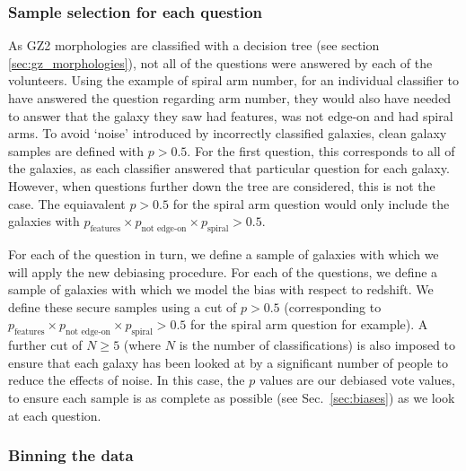 \documentclass[useAMS,usenatbib]{mn2e}
\begin{document}
\subsubsection{Sample selection for each question}
\label{sec:sample_selection_per_question}

As GZ2 morphologies are classified with a decision tree (see section \ref{sec:gz_morphologies}), not all of the questions were answered by each of the volunteers. Using the example of spiral arm number, for an individual classifier to have answered the question regarding arm number, they would also have needed to answer that the galaxy they saw had features, was not edge-on and had spiral arms. To avoid `noise' introduced by incorrectly classified galaxies, clean galaxy samples are defined with $p > 0.5$. For the first question, this corresponds to all of the galaxies, as each classifier answered that particular question for each galaxy. However, when questions further down the tree are considered, this is not the case. The equiavalent $p>0.5$ for the spiral arm question would only include the galaxies with $p_{\textrm{features}} \times p_{\textrm{not edge-on}} \times p_{\textrm{spiral}} > 0.5$. 

For each of the question in turn, we define a sample of galaxies with which we will apply the new debiasing procedure. For each of the questions, we define a sample of galaxies with which we model the bias with respect to redshift. We define these secure samples using a cut of $p>0.5$ (corresponding to $p_{\textrm{features}} \times p_{\textrm{not edge-on}} \times p_{\textrm{spiral}} > 0.5$ for the spiral arm question for example). A further cut of $N \geq 5$ (where $N$ is the number of classifications) is also imposed to ensure that each galaxy has been looked at by a significant number of people to reduce the effects of noise. In this case, the $p$ values are our debiased vote values, to ensure each sample is as complete as possible (see Sec.~\ref{sec:biases}) as we look at each question.
\subsubsection{Binning the data}
\label{sec:binning}
\end{document}
